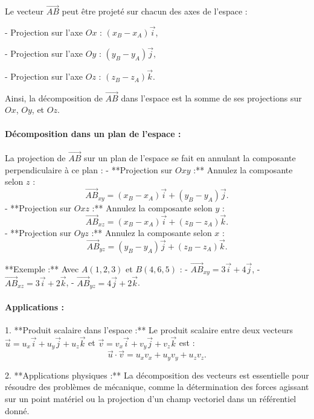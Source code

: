 \documentclass{article}
\begin{document}
Le vecteur \( \overrightarrow{AB} \) peut être projeté sur chacun des axes de l’espace :

- Projection sur l’axe \( Ox \) : \( (x_B - x_A)\vec{i} \),

- Projection sur l’axe \( Oy \) : \( (y_B - y_A)\vec{j} \),

- Projection sur l’axe \( Oz \) : \( (z_B - z_A)\vec{k} \).

Ainsi, la décomposition de \( \overrightarrow{AB} \) dans l’espace est la somme de ses projections sur \( Ox \), \( Oy \), et \( Oz \).

\paragraph{Décomposition dans un plan de l’espace :}

La projection de \( \overrightarrow{AB} \) sur un plan de l’espace se fait en annulant la composante perpendiculaire à ce plan :  
- **Projection sur \( Oxy \) :**  
  Annulez la composante selon \( z \) :  
  \[
  \overrightarrow{AB}_{xy} = (x_B - x_A)\vec{i} + (y_B - y_A)\vec{j}.
  \]
- **Projection sur \( Oxz \) :**  
  Annulez la composante selon \( y \) :  
  \[
  \overrightarrow{AB}_{xz} = (x_B - x_A)\vec{i} + (z_B - z_A)\vec{k}.
  \]
- **Projection sur \( Oyz \) :**  
  Annulez la composante selon \( x \) :  
  \[
  \overrightarrow{AB}_{yz} = (y_B - y_A)\vec{j} + (z_B - z_A)\vec{k}.
  \]

**Exemple :**  
Avec \( A(1, 2, 3) \) et \( B(4, 6, 5) \) :  
- \( \overrightarrow{AB}_{xy} = 3\vec{i} + 4\vec{j} \),  
- \( \overrightarrow{AB}_{xz} = 3\vec{i} + 2\vec{k} \),  
- \( \overrightarrow{AB}_{yz} = 4\vec{j} + 2\vec{k} \).

\paragraph{Applications :}

1. **Produit scalaire dans l’espace :**  
   Le produit scalaire entre deux vecteurs \( \vec{u} = u_x\vec{i} + u_y\vec{j} + u_z\vec{k} \) et \( \vec{v} = v_x\vec{i} + v_y\vec{j} + v_z\vec{k} \) est :  
   \[
   \vec{u} \cdot \vec{v} = u_x v_x + u_y v_y + u_z v_z.
   \]

2. **Applications physiques :**  
   La décomposition des vecteurs est essentielle pour résoudre des problèmes de mécanique, comme la détermination des forces agissant sur un point matériel ou la projection d’un champ vectoriel dans un référentiel donné.
\end{document}
